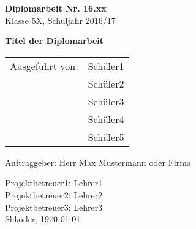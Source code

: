 
\newcommand{\trtitle}{Titel der Diplomarbeit}
\newcommand{\trort}{Shkoder}
\newcommand{\trbetreuer}{Titel Betreuer}
\newcommand{\trfachgebiet}{SEW, INSY, NWTK, ...}
\newcommand{\trdate}{\today}
\newcommand{\trnumber}{16.xx}
\newcommand{\trclass}{5X}
\newcommand{\trschuelereins}{Sch\"uler1}
\newcommand{\trschuelerzwei}{Sch\"uler2}
\newcommand{\trschuelerdrei}{Sch\"uler3}
\newcommand{\trschuelervier}{Sch\"uler4}
\newcommand{\trschuelerfuenf}{Sch\"uler5}
\newcommand{\trsauftraggeber}{Herr Max Mustermann oder Firma}
\newcommand{\trbetreuereins}{Lehrer1}
\newcommand{\trbetreuerzwei}{Lehrer2}
\newcommand{\trbetreuerdrei}{Lehrer3}

\thispagestyle{empty}

\vspace{0.1cm}
\begin{flushleft}
\textbf{\LARGE Diplomarbeit Nr. \trnumber} \\
\LARGE Klasse \trclass{}, Schuljahr 2016/17

\vspace{9cm}
\textbf{\LARGE \trtitle}

\vspace{0.4cm}
\begin{table}[htbp]
\Large
\begin{tabular}{cl}
   Ausgef\"uhrt von: & \trschuelereins \\ 
   & \trschuelerzwei \\ 
   & \trschuelerdrei \\ 
   & \trschuelervier \\ 
   & \trschuelerfuenf \\ 
 \end{tabular}
\end{table}
\end{flushleft}

\vspace{0.1cm}
\Large Auftraggeber: \trsauftraggeber

\vspace{0.4cm}
\large Projektbetreuer1: \trbetreuereins \\
\large Projektbetreuer2: \trbetreuerzwei \\
\large Projektbetreuer3: \trbetreuerdrei \\
\newline
\large \trort{}, \today 

\vfill
